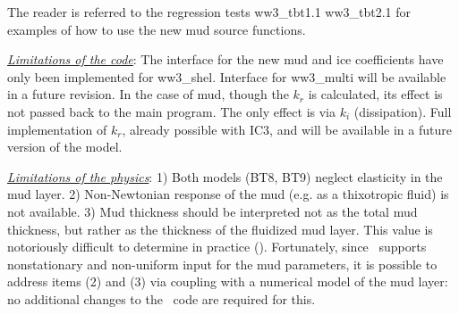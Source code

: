 The reader is referred to the regression tests {\file ww3\_tbt1.1} {\file ww3\_tbt2.1} for examples of how to use the new mud source functions.

\textrm{\textit{\underline{Limitations of the code}}}: The interface for the new mud and ice coefficients have only been implemented for {\file ww3\_shel}. Interface for {\file ww3\_multi} will be available in a future revision. In the case of mud, though the ${k_r}$ is calculated, its effect is not passed back to the main program. The only effect is via ${k_i}$ (dissipation). Full implementation of ${k_r}$, already possible with IC3, and will be available in a future version of the model. 

\textrm{\textit{\underline{Limitations of the physics}}}: 1) Both models ({\code BT8}, {\code BT9}) neglect elasticity in the mud layer. 2) Non-Newtonian response of the mud (e.g. as a thixotropic fluid) is not available. 3) Mud thickness should be interpreted not as the total mud thickness, but rather as the thickness of the fluidized mud layer. This value is notoriously difficult to determine in practice (\cite{art:RogHol09}). Fortunately, since \ws\  supports nonstationary and non-uniform input for the mud parameters, it is possible to address items (2) and (3) via coupling with a numerical model of the mud layer: no additional changes to the \ws\ code are required for this. 
